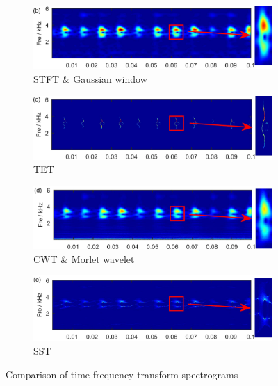 \begin{figure}[ht]
    \centering
    \begin{subfigure}[b]{0.49\textwidth}
        \includegraphics[width=\textwidth]{assets/stft-spectrogram-sample.png}
        \caption{STFT \& Gaussian window}
    \end{subfigure}
    \hfill
    \begin{subfigure}[b]{0.49\textwidth}
        \includegraphics[width=\textwidth]{assets/tet-spectrogram-sample.png}
        \caption{TET}
    \end{subfigure}
    \hfill
    \begin{subfigure}[b]{0.49\textwidth}
        \includegraphics[width=\textwidth]{assets/wt-spectrogram-sample.png}
        \caption{CWT \& Morlet wavelet}
    \end{subfigure}
    \hfill
    \begin{subfigure}[b]{0.49\textwidth}
        \includegraphics[width=\textwidth]{assets/sst-spectrogram-sample.png}
        \caption{SST}
    \end{subfigure}
    \caption{Comparison of time-frequency transform spectrograms~\cite{yu_concentrated_2020}}
    \label{fig:transforms}
\end{figure}

